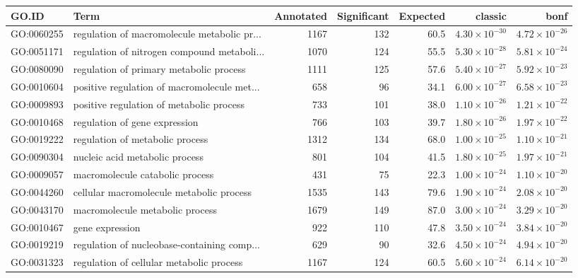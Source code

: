 \begin{table}[ht]
\centering
\begin{adjustbox}{max width=\textwidth}
\begin{tabular}{llrrrrr}
  \hline
GO.ID & Term & Annotated & Significant & Expected & classic & bonf \\ 
  \hline
GO:0060255 & regulation of macromolecule metabolic pr... & 1167 & 132 & 60.5 & $4.30 \times 10^{-30}$ & $4.72 \times 10^{-26}$ \\ 
  GO:0051171 & regulation of nitrogen compound metaboli... & 1070 & 124 & 55.5 & $5.30 \times 10^{-28}$ & $5.81 \times 10^{-24}$ \\ 
  GO:0080090 & regulation of primary metabolic process & 1111 & 125 & 57.6 & $5.40 \times 10^{-27}$ & $5.92 \times 10^{-23}$ \\ 
  GO:0010604 & positive regulation of macromolecule met... & 658 & 96 & 34.1 & $6.00 \times 10^{-27}$ & $6.58 \times 10^{-23}$ \\ 
  GO:0009893 & positive regulation of metabolic process & 733 & 101 & 38.0 & $1.10 \times 10^{-26}$ & $1.21 \times 10^{-22}$ \\ 
  GO:0010468 & regulation of gene expression & 766 & 103 & 39.7 & $1.80 \times 10^{-26}$ & $1.97 \times 10^{-22}$ \\ 
  GO:0019222 & regulation of metabolic process & 1312 & 134 & 68.0 & $1.00 \times 10^{-25}$ & $1.10 \times 10^{-21}$ \\ 
  GO:0090304 & nucleic acid metabolic process & 801 & 104 & 41.5 & $1.80 \times 10^{-25}$ & $1.97 \times 10^{-21}$ \\ 
  GO:0009057 & macromolecule catabolic process & 431 & 75 & 22.3 & $1.00 \times 10^{-24}$ & $1.10 \times 10^{-20}$ \\ 
  GO:0044260 & cellular macromolecule metabolic process & 1535 & 143 & 79.6 & $1.90 \times 10^{-24}$ & $2.08 \times 10^{-20}$ \\ 
  GO:0043170 & macromolecule metabolic process & 1679 & 149 & 87.0 & $3.00 \times 10^{-24}$ & $3.29 \times 10^{-20}$ \\ 
  GO:0010467 & gene expression & 922 & 110 & 47.8 & $3.50 \times 10^{-24}$ & $3.84 \times 10^{-20}$ \\ 
  GO:0019219 & regulation of nucleobase-containing comp... & 629 & 90 & 32.6 & $4.50 \times 10^{-24}$ & $4.94 \times 10^{-20}$ \\ 
  GO:0031323 & regulation of cellular metabolic process & 1167 & 124 & 60.5 & $5.60 \times 10^{-24}$ & $6.14 \times 10^{-20}$ \\ 

\end{tabular}
\end{adjustbox}
\end{table}
